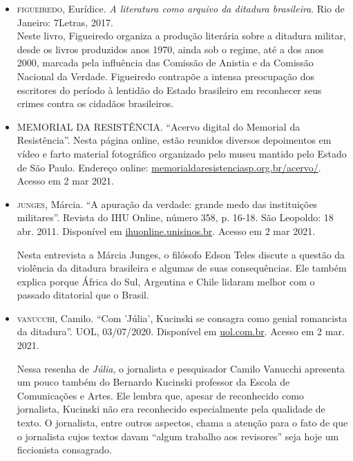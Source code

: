 \documentclass[12pt]{extarticle}
\begin{document}
\begin{itemize}

\item \textsc{figueiredo}, Eurídice. \emph{A literatura como arquivo da ditadura
brasileira}. Rio de Janeiro: 7Letras, 2017.\\
Neste livro, Figueiredo organiza a produção literária sobre a ditadura
militar, desde os livros produzidos anos 1970, ainda sob o regime, até a
dos anos 2000, marcada pela influência das Comissão de Anistia e da
Comissão Nacional da Verdade. Figueiredo contrapõe a intensa preocupação
dos escritores do período à lentidão do Estado brasileiro em reconhecer
seus crimes contra os cidadãos brasileiros.

\item \textsc{MEMORIAL DA RESISTÊNCIA}. ``Acervo digital do Memorial da Resistência''. Nesta página online, estão reunidos diversos depoimentos em vídeo e farto material fotográfico organizado pelo museu mantido pelo Estado de São Paulo. Endereço online: \href{http://http://memorialdaresistenciasp.org.br/acervo/}{{memorialdaresistenciasp.org.br/acervo/}}.
Acesso em 2 mar 2021.

\item \textsc{junges}, Márcia. ``A apuração da verdade: grande medo das instituições
militares''. Revista do IHU Online, número 358, p. 16-18. São Leopoldo:
18 abr. 2011. Disponível em
\href{http://www.ihuonline.unisinos.br/media/pdf/IHUOnlineEdicao358.pdf}{{ihuonline.unisinos.br}}.
Acesso em 2 mar 2021.

Nesta entrevista a Márcia Junges, o filósofo Edson Teles discute a
questão da violência da ditadura brasileira e algumas de suas
consequências. Ele também explica porque África do Sul, Argentina e
Chile lidaram melhor com o passado ditatorial que o Brasil.

\item \textsc{vanucchi}, Camilo. ``Com 'Júlia', Kucinski se consagra como genial
romancista da ditadura''. UOL, 03/07/2020. Disponível em
\href{https://noticias.uol.com.br/colunas/camilo-vannuchi/2020/07/03/com-julia-kucinski-se-consagra-como-genial-romancista-da-ditadura.htm}{{uol.com.br}}.
Acesso em 2 mar. 2021.

Nessa resenha de \emph{Júlia}, o jornalista e pesquisador Camilo
Vanucchi apresenta um pouco também do Bernardo Kucinski professor da
Escola de Comunicações e Artes. Ele lembra que, apesar de reconhecido
como jornalista, Kucinski não era reconhecido especialmente pela
qualidade de texto. O jornalista, entre outros aspectos, chama a atenção
para o fato de que o jornalista cujos textos davam ``algum trabalho aos
revisores'' seja hoje um ficcionista consagrado.
\end{itemize}
\end{document}
